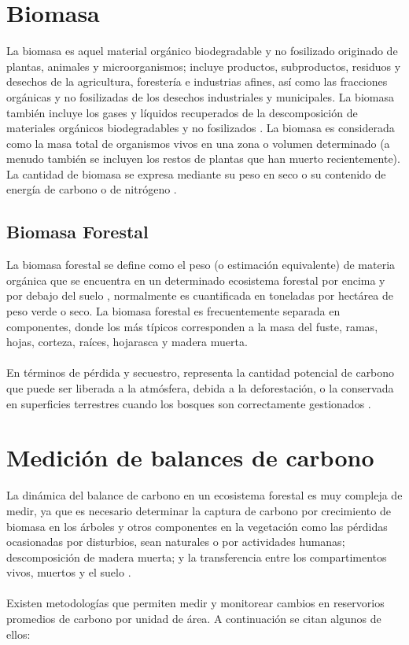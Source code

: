 \section{Biomasa}
La biomasa es aquel material org\'anico biodegradable y no fosilizado originado de plantas, animales y microorganismos; incluye productos, subproductos, residuos y desechos de la agricultura, forester\'ia e industrias afines, as\'i como las fracciones org\'anicas y no fosilizadas de los desechos industriales y municipales. La biomasa tambi\'en incluye los gases y l\'iquidos recuperados de la descomposici\'on de materiales org\'anicos biodegradables y no fosilizados \cite{salinas2008guia}.
La biomasa es considerada como la masa total de organismos vivos en una zona o volumen determinado (a menudo tambi\'en se incluyen los restos de plantas que han muerto recientemente). La cantidad de biomasa se expresa mediante su peso en seco o su contenido de energ\'ia de carbono o de nitr\'ogeno \cite{garciduenas1987produccion}.
\subsection{Biomasa Forestal}
La biomasa forestal se define como el peso (o estimaci\'on equivalente) de materia org\'anica que
se encuentra en un determinado ecosistema forestal por encima y por debajo del suelo \cite{schlegel2000manual}, normalmente es
cuantificada en toneladas por hect\'area de peso verde o seco. La biomasa forestal es frecuentemente separada en
componentes, donde los m\'as t\'ipicos corresponden a la masa del fuste, ramas, hojas, corteza,
ra\'ices, hojarasca y madera muerta. \\~\\
En t\'erminos de p\'erdida y secuestro, representa la cantidad potencial de carbono que puede ser liberada a la atm\'osfera, debida a la deforestaci\'on, o la conservada en superficies terrestres cuando los bosques son correctamente gestionados \cite{lu2005exploring}.

\section{Medici\'on de balances de carbono}
La din\'amica del balance de carbono en un ecosistema forestal es muy compleja de medir, ya que es necesario determinar la captura de carbono por crecimiento de biomasa en los \'arboles y otros componentes en la vegetaci\'on como las p\'erdidas ocasionadas por disturbios, sean naturales o por actividades humanas; descomposici\'on de madera muerta; y la transferencia entre los compartimentos vivos, muertos y el suelo \cite{angelsen2008moving}.\\~\\
Existen metodolog\'ias que permiten medir y monitorear cambios en reservorios promedios de carbono por unidad de \'area. A continuaci\'on se citan algunos de ellos:

